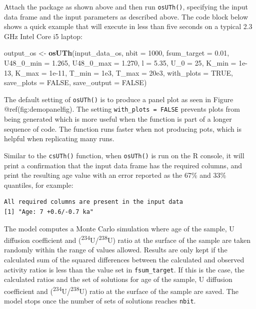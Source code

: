 \documentclass[]{elsarticle} %
\newenvironment{Shaded}{\begin{snugshade}}{\end{snugshade}}
\newcommand{\DataTypeTok}[1]{\textcolor[rgb]{0.13,0.29,0.53}{#1}}
\newcommand{\DecValTok}[1]{\textcolor[rgb]{0.00,0.00,0.81}{#1}}
\newcommand{\FloatTok}[1]{\textcolor[rgb]{0.00,0.00,0.81}{#1}}
\newcommand{\KeywordTok}[1]{\textcolor[rgb]{0.13,0.29,0.53}{\textbf{#1}}}
\newcommand{\NormalTok}[1]{#1}
\newcommand{\OtherTok}[1]{\textcolor[rgb]{0.56,0.35,0.01}{#1}}
\newcommand{\StringTok}[1]{\textcolor[rgb]{0.31,0.60,0.02}{#1}}
\begin{document}
Attach the package as shown above and then run \texttt{osUTh()}, specifying the input data frame and the input parameters as described above. The code block below shows a quick example that will execute in less than five seconds on a typical 2.3 GHz Intel Core i5 laptop:

\begin{Shaded}
\begin{Highlighting}[]
\NormalTok{output_os <-}\StringTok{ }\KeywordTok{osUTh}\NormalTok{(input_data_os,}
                   \DataTypeTok{nbit =} \DecValTok{1000}\NormalTok{,}
                   \DataTypeTok{fsum_target =} \FloatTok{0.01}\NormalTok{,}
                   \DataTypeTok{U48_0_min =} \FloatTok{1.265}\NormalTok{,}
                   \DataTypeTok{U48_0_max =} \FloatTok{1.270}\NormalTok{,}
                   \DataTypeTok{l =} \FloatTok{5.35}\NormalTok{,}
                   \DataTypeTok{U_0 =} \DecValTok{25}\NormalTok{,}
                   \DataTypeTok{K_min =} \FloatTok{1e-13}\NormalTok{,}
                   \DataTypeTok{K_max =} \FloatTok{1e-11}\NormalTok{,}
                   \DataTypeTok{T_min =} \FloatTok{1e3}\NormalTok{,}
                   \DataTypeTok{T_max =} \FloatTok{20e3}\NormalTok{,}
                   \DataTypeTok{with_plots =} \OtherTok{TRUE}\NormalTok{,}
                   \DataTypeTok{save_plots =} \OtherTok{FALSE}\NormalTok{,}
                   \DataTypeTok{save_output =} \OtherTok{FALSE}\NormalTok{)}
\end{Highlighting}
\end{Shaded}

The default setting of \texttt{osUTh()} is to produce a panel plot as seen in Figure @ref(fig:demopanelfig). The setting \texttt{with\_plots\ =\ FALSE} prevents plots from being generated which is more useful when the function is part of a longer sequence of code. The function runs faster when not producing pots, which is helpful when replicating many runs.

Similar to the \texttt{csUTh()} function, when \texttt{osUTh()} is run on the R console, it will print a confirmation that the input data frame has the required columns, and print the resulting age value with an error reported as the 67\% and 33\% quantiles, for example:

\begin{verbatim}
All required columns are present in the input data
[1] "Age: 7 +0.6/-0.7 ka"
\end{verbatim}

The model computes a Monte Carlo simulation where age of the sample, U diffusion coefficient and (\textsuperscript{234}U/\textsuperscript{238}U) ratio at the surface of the sample are taken randomly within the range of values allowed. Results are only kept if the calculated sum of the squared differences between the calculated and observed activity ratios is less than the value set in \texttt{fsum\_target}. If this is the case, the calculated ratios and the set of solutions for age of the sample, U diffusion coefficient and (\textsuperscript{234}U/\textsuperscript{238}U) ratio at the surface of the sample are saved. The model stops once the number of sets of solutions reaches \texttt{nbit}.
\end{document}
